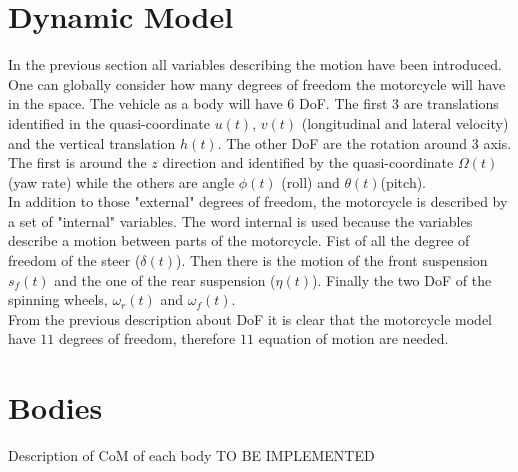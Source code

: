 \section{Dynamic Model}
%
In the previous section all variables describing the motion have been introduced. One can globally consider how many degrees of freedom the motorcycle will have in the space. The vehicle as a body will have 6 DoF. The first 3 are translations identified in the quasi-coordinate $u(t)$, $v(t)$ (longitudinal and lateral velocity) and the vertical translation $h(t)$. The other DoF are the rotation around 3 axis. The first is around the $z$ direction and identified by the quasi-coordinate $\Omega(t)$ (yaw rate) while the others are angle $\phi(t)$ (roll) and $\theta(t)$(pitch).\\
In addition to those "external" degrees of freedom, the motorcycle is described by a set of "internal" variables. The word internal is used because the variables describe a motion between parts of the motorcycle. Fist of all the degree of freedom of the steer ($\delta(t)$). Then there is the motion of the front suspension $s_f(t)$ and the one of the rear suspension ($\eta(t)$). Finally the two DoF of the spinning wheels, $\omega_r(t)$ and $\omega_f(t)$.\\
From the previous description about DoF it is clear that the motorcycle model have $11$ degrees of freedom, therefore $11$ equation of motion are needed.\\
%
\section{Bodies}
Description of CoM of each body
TO BE IMPLEMENTED 
%
